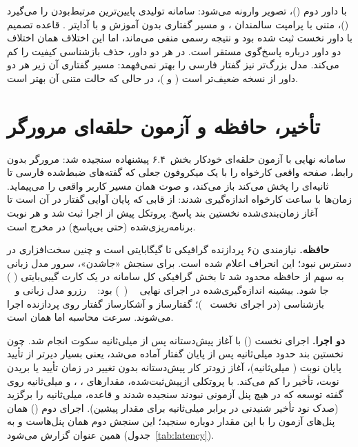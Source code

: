با داور دوم ()، تصویر وارونه می‌شود: سامانه تولیدی پایین‌ترین
مرتبط‌بودن را می‌گیرد ()،  متنی با پرامپت سالمندان ، و
مسیر گفتاری بدون آموزش  و با آداپتر . قاعده تصمیم با داور نخست
ثبت شده بود و نتیجه رسمی منفی می‌ماند، اما این اختلاف همان اختلاف دو داور درباره
پاسخ‌گوی مستقر است. در هر دو داور، حذف بازشناسی کیفیت را کم می‌کند. مدل بزرگ‌تر
 نیز گفتار فارسی را بهتر نمی‌فهمد: مسیر گفتاری آن زیر هر دو داور از
نسخه  ضعیف‌تر است ( و )، در حالی که حالت متنی آن بهتر است.

\section{تأخیر، حافظه و آزمون حلقه‌ای مرورگر}
\label{sec:res-latency}

سامانه نهایی با آزمون حلقه‌ای خودکار بخش~۶.۴ پیشنهاده سنجیده شد: مرورگر
 بدون رابط، صفحه واقعی کارخواه را با یک میکروفون جعلی که
گفته‌های ضبط‌شده فارسی  تا  ثانیه‌ای را پخش می‌کند باز می‌کند، و
صوت همان مسیر کاربر واقعی را می‌پیماید. زمان‌ها با ساعت کارخواه اندازه‌گیری
شدند: از قابی که پایان آوایی گفتار در آن است تا آغاز زمان‌بندی‌شده نخستین بند
پاسخ. پروتکل پیش از اجرا ثبت شد و هر نوبت برنامه‌ریزی‌شده (حتی بی‌پاسخ) در
مخرج است.

\textbf{حافظه.} نیازمندی ن۶ پردازنده گرافیکی  تا  گیگابایتی
است و چنین سخت‌افزاری در دسترس نبود؛ این انحراف اعلام شده است. برای سنجش
«جاشدن»، سرور مدل زبانی به سهم  از حافظه  محدود شد تا بخش
گرافیکی کل سامانه در یک کارت  گیبی‌بایتی ( ) جا شود.
بیشینه اندازه‌گیری‌شده در اجرای نهایی \textbf{~} (~) بود:
~ رزرو مدل زبانی و ~ بازشناسی (در اجرای نخست
~)؛ گفتارساز و آشکارساز گفتار روی پردازنده اجرا می‌شوند. سرعت
محاسبه اما همان  است.

\textbf{دو اجرا.} اجرای نخست () با آغاز پیش‌دستانه پس از 
میلی‌ثانیه سکوت انجام شد. چون نخستین بند حدود  میلی‌ثانیه پس از پایان
گفتار آماده می‌شد، یعنی بسیار دیرتر از تأیید پایان نوبت ( میلی‌ثانیه)،
آغاز زودتر کار پیش‌دستانه بدون تغییر در زمان تأیید یا بریدن نوبت، تأخیر را کم
می‌کند. با پروتکلی ازپیش‌ثبت‌شده، مقدارهای ، ،  و
 میلی‌ثانیه روی  گفته توسعه که در هیچ پنل آزمونی نبودند سنجیده
شدند و قاعده،  میلی‌ثانیه را برگزید (صدک نود تأخیر شنیدنی  در
برابر  میلی‌ثانیه برای مقدار پیشین). اجرای دوم () همان پنل‌های
آزمون را با این مقدار دوباره سنجید؛ این سنجش دوم همان پنل‌هاست و به همین عنوان
گزارش می‌شود (جدول~\ref{tab:latency}).


